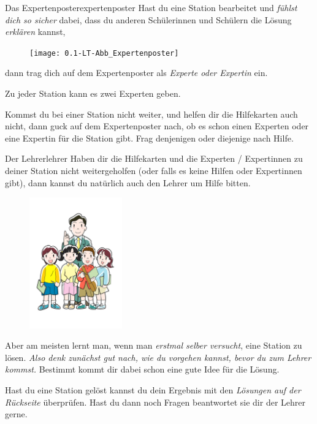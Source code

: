 \documentclass[12pt,a5paper,landscape]{scrartcl}
\begin{document}
\begin{hilfekarte}{Das Expertenposter}{expertenposter}
Hast du eine Station bearbeitet und \emph{fühlst dich so sicher} dabei, dass du anderen Schülerinnen und Schülern die Lösung \emph{erklären} kannst, \begin{figure}
\texttt{[image: 0.1-LT-Abb\_Expertenposter]}
\end{figure}dann trag dich auf dem Expertenposter als \emph{Experte oder Expertin} ein.

\medskip
Zu jeder Station kann es zwei Experten geben.

\bigskip
Kommst du bei einer Station nicht weiter, und helfen dir die Hilfekarten auch nicht, dann guck auf dem Expertenposter nach, ob es schon einen Experten oder eine Expertin für die Station gibt. Frag denjenigen oder diejenige nach Hilfe.
\end{hilfekarte}

\leereKarte

\begin{hilfekarte}{Der Lehrer}{lehrer}
Haben dir die Hilfekarten und die Experten / Expertinnen zu deiner Station nicht weitergeholfen (oder falls es keine Hilfen oder Expertinnen gibt), dann kannst du natürlich auch den Lehrer um Hilfe bitten.

\medskip
\begin{figure}
\includegraphics[width=4cm]{0.1-LT-Abb_Lehrer}
\end{figure}
Aber am meisten lernt man, wenn man \emph{erstmal selber versucht}, eine Station zu lösen. \emph{Also denk zunächst gut nach, wie du vorgehen kannst, bevor du zum Lehrer kommst.} Bestimmt kommt dir dabei schon eine gute Idee für die Lösung.

\medskip
Hast du eine Station gelöst kannst du dein Ergebnis mit den \emph{Lösungen auf der Rückseite} überprüfen. Hast du dann noch Fragen beantwortet sie dir der Lehrer gerne.
\end{hilfekarte}

\leereKarte
	
\end{document}
